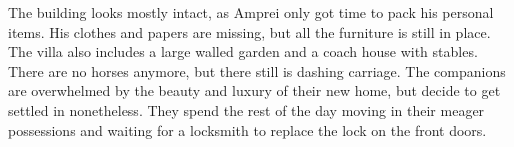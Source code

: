 The building looks mostly intact, as Amprei only got time to pack his personal items. His clothes and papers are missing, but all the furniture is still in place. The villa also includes a large walled garden and a coach house with stables. There are no horses anymore, but there still is dashing carriage. The companions are overwhelmed by the beauty and luxury of their new home, but decide to get settled in nonetheless. They spend the rest of the day moving in their meager possessions and waiting for a locksmith to replace the lock on the front doors.\\

